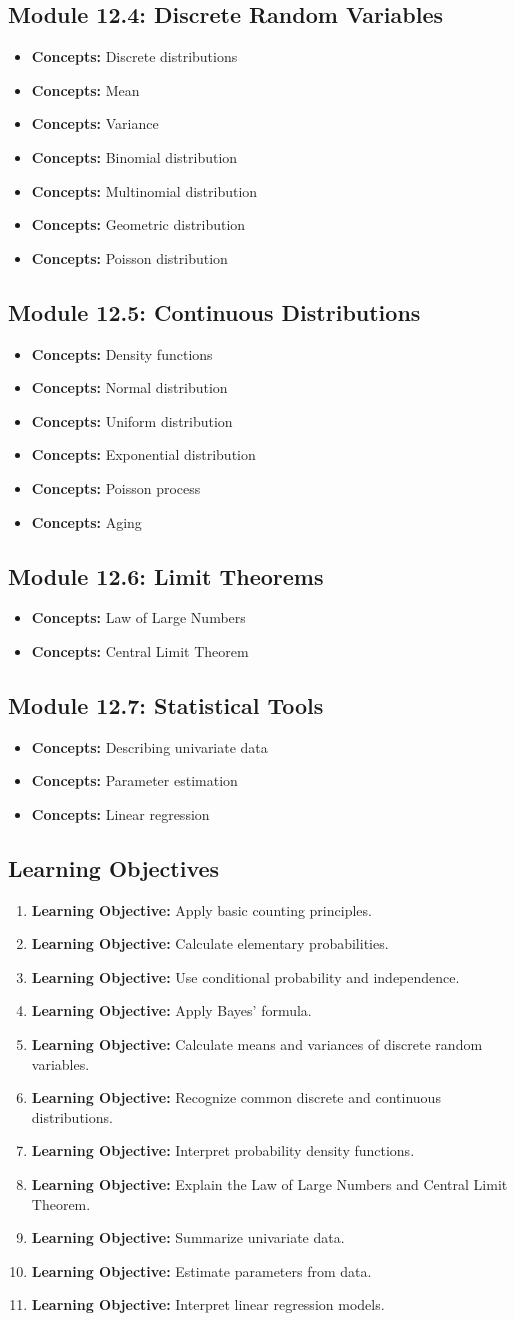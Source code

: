 \documentclass[11pt]{article}
\newcommand{\objective}[1]{\item \textbf{Learning Objective:} #1}
\newcommand{\concept}[1]{\item \textbf{Concepts:} #1}
\begin{document}
\subsection{Module 12.4: Discrete Random Variables}

\begin{itemize}
    \concept{Discrete distributions}
    \concept{Mean}
    \concept{Variance}
    \concept{Binomial distribution}
    \concept{Multinomial distribution}
    \concept{Geometric distribution}
    \concept{Poisson distribution}
\end{itemize}

\subsection{Module 12.5: Continuous Distributions}

\begin{itemize}
    \concept{Density functions}
    \concept{Normal distribution}
    \concept{Uniform distribution}
    \concept{Exponential distribution}
    \concept{Poisson process}
    \concept{Aging}
\end{itemize}

\subsection{Module 12.6: Limit Theorems}

\begin{itemize}
    \concept{Law of Large Numbers}
    \concept{Central Limit Theorem}
\end{itemize}

\subsection{Module 12.7: Statistical Tools}

\begin{itemize}
    \concept{Describing univariate data}
    \concept{Parameter estimation}
    \concept{Linear regression}
\end{itemize}

\subsection{Learning Objectives}

\begin{enumerate}
    \objective{Apply basic counting principles.}
    \objective{Calculate elementary probabilities.}
    \objective{Use conditional probability and independence.}
    \objective{Apply Bayes' formula.}
    \objective{Calculate means and variances of discrete random variables.}
    \objective{Recognize common discrete and continuous distributions.}
    \objective{Interpret probability density functions.}
    \objective{Explain the Law of Large Numbers and Central Limit Theorem.}
    \objective{Summarize univariate data.}
    \objective{Estimate parameters from data.}
    \objective{Interpret linear regression models.}
\end{enumerate}
\end{document}
